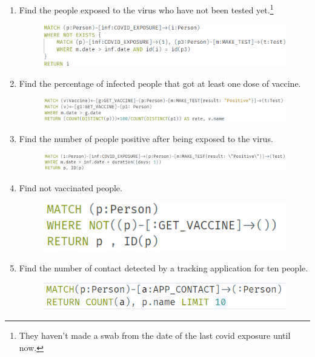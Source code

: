\begin{enumerate}[leftmargin=*,label=\textbf{\thesection.\arabic*}]
\begin{figure}[!htb]
    \end{figure}
\newpage
    \item Find the people exposed to the virus who have not been tested yet.\footnote{They haven't made a swab from the date of the last covid exposure until now.}
    \begin{figure}[!htb]
        \centering
        \includegraphics[width=\textwidth]{images/exposed_not_tested.png}
    \end{figure} 
    \item Find the percentage of infected people that got at least one dose of vaccine.
    \begin{figure}[h]  
        \centering
        \includegraphics[width=\textwidth]{images/positive_after_vaccine.png}
    \end{figure}
    \item Find the number of people positive after being exposed to the virus.
    \begin{figure}[h]  
        \centering
        \includegraphics[width=\textwidth]{images/application_screenshots/positive_after_exposure.png}
    \end{figure}
    \item Find not vaccinated people.
    \begin{figure}[!h]  
        \includegraphics[scale = 0.65]{images/application_screenshots/not_vaccinated.png}
    \end{figure}
    \item Find the number of contact detected by a tracking application for ten people.
    \begin{figure}[!h]  
        \includegraphics[scale = 0.65]{images/application_screenshots/app_contact_for_10_people.png}
    \end{figure}
    
\end{enumerate}